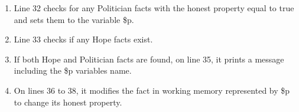 \begin{enumerate}[topsep=2pt,itemsep=2pt,partopsep=2pt, parsep=2pt]
    \begin{enumerate}[topsep=2pt,itemsep=2pt,partopsep=2pt, parsep=2pt]
        \item Line 32 checks for any Politician facts with the honest property equal to true and sets them to the variable \$p.
        \item Line 33 checks if any Hope facts exist.
        \item If both Hope and Politician facts are found, on line 35, it prints a message including the \$p variables name.
        \item On lines 36 to 38, it modifies the fact in working memory represented by \$p to change its honest property.
    \end{enumerate}
\end{enumerate}